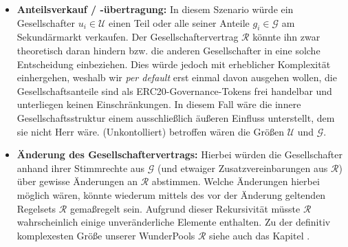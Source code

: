 \begin{Fazit}
\begin{itemize}
\begin{itemize}
  \end{itemize}
  \item \textbf{Anteilsverkauf / -übertragung:} In diesem Szenario würde ein Gesellschafter $u_{i} \in \mathcal{U}$ einen Teil oder alle seiner Anteile $g_{i} \in \mathcal{G}$ am Sekundärmarkt verkaufen. Der Gesellschaftervertrag $\mathcal{R}$ könnte ihn zwar theoretisch daran hindern bzw. die anderen Gesellschafter in eine solche Entscheidung einbeziehen. Dies würde jedoch mit erheblicher Komplexität einhergehen, weshalb wir \textit{per default} erst einmal davon ausgehen wollen, die Gesellschaftsanteile sind als ERC20-Gover\-nance-Tokens frei handelbar und unterliegen keinen Einschränkungen. In diesem Fall wäre die innere Gesellschaftsstruktur einem ausschließlich äußeren Einfluss unterstellt, dem sie nicht Herr wäre. (Unkontolliert) betroffen wären die Größen $\mathcal{U}$ und $\mathcal{G}$.
  \item \textbf{Änderung des Gesellschaftervertrags:} Hierbei würden die Gesellschafter anhand ihrer Stimmrechte aus $\mathcal{G}$ (und etwaiger Zusatzvereinbarungen aus $\mathcal{R}$) über gewisse Änderungen an $\mathcal{R}$ abstimmen. Welche Änderungen hierbei möglich wären, könnte wiederum mittels des vor der Änderung geltenden Regelsets $\mathcal{R}$ gemaßregelt sein. Aufgrund dieser Rekursivität müsste $\mathcal{R}$ wahr\-scheinlich einige unveränderliche Elemente enthalten. Zu der definitiv komplexesten Größe unserer WunderPools $\mathcal{R}$ siehe auch das Kapitel .
\end{itemize}

\end{Fazit}

\vspace{0.5cm}